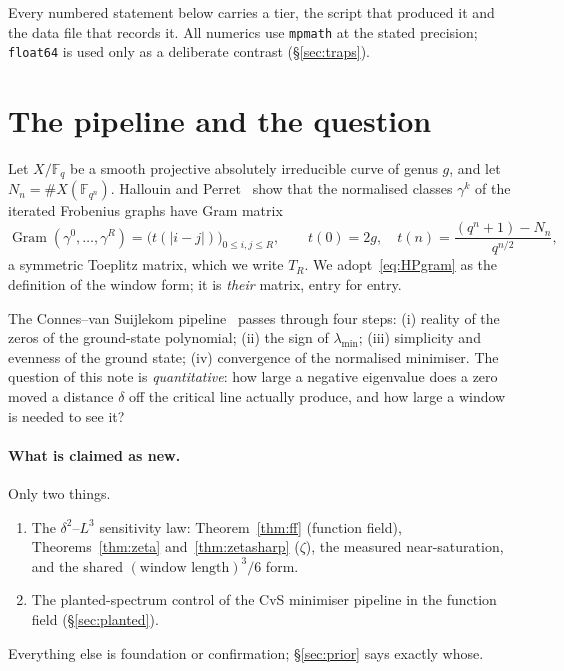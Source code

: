 \documentclass[11pt,a4paper]{article}
\theoremstyle{definition}
\theoremstyle{remark}
\newcommand{\T}{T_R}
\newcommand{\lmin}{\lambda_{\min}}
\newcommand{\Fq}{\mathbb{F}_q}
\begin{document}
\noindent Every numbered statement below carries a tier, the script that produced it and
the data file that records it. All numerics use \texttt{mpmath} at the stated precision;
\texttt{float64} is used only as a deliberate contrast (\S\ref{sec:traps}).

\section{The pipeline and the question}

Let $X/\Fq$ be a smooth projective absolutely irreducible curve of genus $g$, and let
$N_n=\#X(\mathbb{F}_{q^n})$. Hallouin and Perret~\cite[Prop.~5]{HP19} show that the
normalised classes $\gamma^{k}$ of the iterated Frobenius graphs have Gram matrix
\begin{equation}\label{eq:HPgram}
\operatorname{Gram}(\gamma^0,\dots,\gamma^R)=\bigl(t(|i-j|)\bigr)_{0\le i,j\le R},
\qquad
t(0)=2g,\quad t(n)=\frac{(q^{n}+1)-N_n}{q^{n/2}},
\end{equation}
a symmetric Toeplitz matrix, which we write $\T$. We adopt~\eqref{eq:HPgram} as the
definition of the window form; it is \emph{their} matrix, entry for entry.

The Connes--van Suijlekom pipeline~\cite{CvS} passes through four steps: (i) reality of the
zeros of the ground-state polynomial; (ii) the sign of $\lmin$; (iii) simplicity and
evenness of the ground state; (iv) convergence of the normalised minimiser. The question
of this note is \emph{quantitative}: how large a negative eigenvalue does a zero moved a
distance $\delta$ off the critical line actually produce, and how large a window is needed
to see it?

\paragraph{What is claimed as new.} Only two things.
\begin{enumerate}
\item[(N1)] The $\delta^{2}$--$L^{3}$ sensitivity law: Theorem~\ref{thm:ff} (function field),
Theorems~\ref{thm:zeta} and~\ref{thm:zetasharp} ($\zeta$), the measured near-saturation,
and the shared $(\text{window length})^{3}/6$ form.
\item[(N2)] The planted-spectrum control of the CvS minimiser pipeline in the function
field (\S\ref{sec:planted}).
\end{enumerate}
Everything else is foundation or confirmation; \S\ref{sec:prior} says exactly whose.
\end{document}
